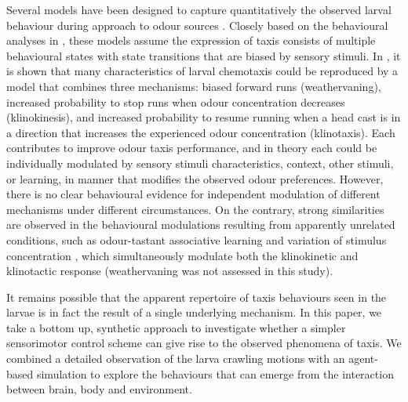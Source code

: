 \documentclass[10pt,a4paper]{article}
\begin{document}
Several models have been designed to capture quantitatively the observed larval behaviour during approach to odour sources  \citep{davies2015model,hernandez2015reverse,schleyer2015learning,gepner2015computations}. Closely based on the behavioural analyses in
 \citet{lahiri2011two,gomez2014multilevel,gomez2011active}, these models assume the expression of taxis consists of multiple behavioural states with state transitions that are biased by sensory stimuli. In \cite{davies2015model}, it is shown that many characteristics of larval chemotaxis could be reproduced by a model that combines three mechanisms: biased forward runs (weathervaning), increased probability to stop runs when odour concentration decreases (klinokinesis), and increased probability to resume running when a head cast is in a direction that increases the experienced odour concentration (klinotaxis). Each contributes to improve odour taxis performance, and in theory each could be individually modulated by sensory stimuli characteristics, context, other stimuli, or learning, in manner that modifies the observed odour preferences. However, there is no clear behavioural evidence for independent modulation of different mechanisms under different circumstances. On the contrary, strong similarities are observed in the behavioural modulations resulting from apparently unrelated conditions, such as odour-tastant associative learning and variation of stimulus concentration \citep{schleyer2015learning}, which simultaneously modulate both the klinokinetic and klinotactic response (weathervaning was not assessed in this study).

It remains possible that the apparent repertoire of taxis behaviours seen in the larvae is in fact the result of a single underlying mechanism. In this paper, we take a bottom up, synthetic approach \citep{braitenberg1986vehicles} to investigate whether a simpler sensorimotor control scheme can give rise to the observed phenomena of taxis. We combined a detailed observation of the larva crawling motions with an agent-based simulation to explore the behaviours that can emerge from the interaction between brain, body and environment.
\end{document}
